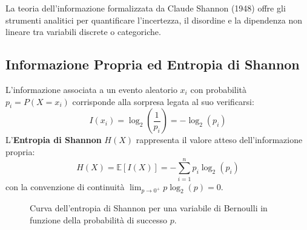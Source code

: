 La teoria dell'informazione formalizzata da Claude Shannon (1948) offre gli strumenti analitici per quantificare l'incertezza, il disordine e la dipendenza non lineare tra variabili discrete o categoriche.

\FloatBarrier
\subsection{Informazione Propria ed Entropia di Shannon}
L'informazione associata a un evento aleatorio $x_i$ con probabilità $p_i = P(X = x_i)$ corrisponde alla sorpresa legata al suo verificarsi:
\begin{equation}
    I(x_i) = \log_2\left(\frac{1}{p_i}\right) = -\log_2(p_i)
\end{equation}
L'\textbf{Entropia di Shannon} $H(X)$ rappresenta il valore atteso dell'informazione propria:
\begin{equation}
    H(X) = \mathbb{E}[I(X)] = -\sum_{i=1}^n p_i \log_2(p_i)
\end{equation}
con la convenzione di continuità $\lim_{p \to 0^+} p \log_2(p) = 0$.

\begin{figure}[H]
\centering
{}
\caption{Curva dell'entropia di Shannon per una variabile di Bernoulli in funzione della probabilità di successo $p$.}
\label{fig:dm-bernoulli-entropy}
\end{figure}

